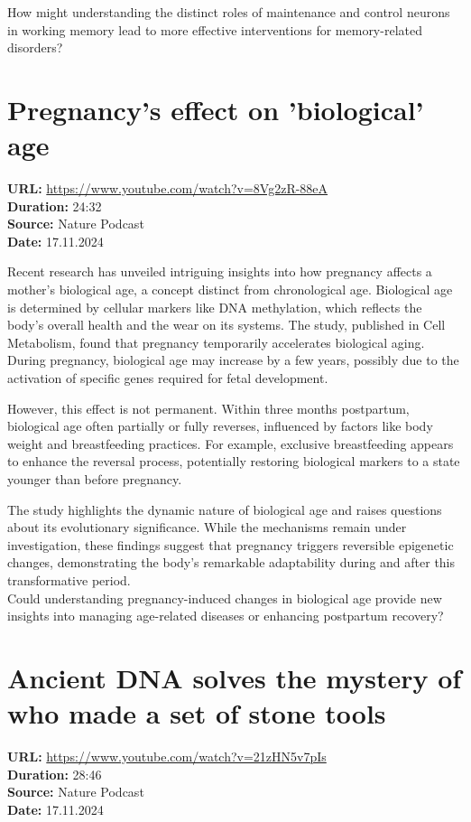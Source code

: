 \documentclass[12pt]{article}
\begin{document}
How might understanding the distinct roles of maintenance and control neurons in working memory lead to more effective interventions for memory-related disorders?



\newpage

\section{Pregnancy's effect on 'biological' age}
\textbf{URL:} \url{https://www.youtube.com/watch?v=8Vg2zR-88eA}\\
\textbf{Duration:} 24:32\\
\textbf{Source:} Nature Podcast\\
\textbf{Date:} 17.11.2024



Recent research has unveiled intriguing insights into how pregnancy affects a mother's biological age, a concept distinct from chronological age. Biological age is determined by cellular markers like DNA methylation, which reflects the body's overall health and the wear on its systems. The study, published in Cell Metabolism, found that pregnancy temporarily accelerates biological aging. During pregnancy, biological age may increase by a few years, possibly due to the activation of specific genes required for fetal development.

However, this effect is not permanent. Within three months postpartum, biological age often partially or fully reverses, influenced by factors like body weight and breastfeeding practices. For example, exclusive breastfeeding appears to enhance the reversal process, potentially restoring biological markers to a state younger than before pregnancy.

The study highlights the dynamic nature of biological age and raises questions about its evolutionary significance. While the mechanisms remain under investigation, these findings suggest that pregnancy triggers reversible epigenetic changes, demonstrating the body's remarkable adaptability during and after this transformative period.\\[5px]


Could understanding pregnancy-induced changes in biological age provide new insights into managing age-related diseases or enhancing postpartum recovery?



\newpage

\section{Ancient DNA solves the mystery of who made a set of stone tools}
\textbf{URL:} \url{https://www.youtube.com/watch?v=21zHN5v7pIs}\\
\textbf{Duration:} 28:46\\
\textbf{Source:} Nature Podcast\\
\textbf{Date:} 17.11.2024
\end{document}
